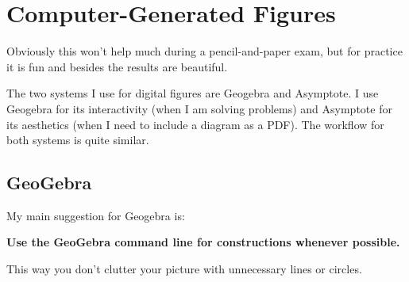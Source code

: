 \documentclass[11pt]{scrartcl}
\begin{document}
\section{Computer-Generated Figures}
Obviously this won't help much during a pencil-and-paper exam,
but for practice it is fun and besides the results are beautiful.

The two systems I use for digital figures are Geogebra and Asymptote.
I use Geogebra for its interactivity (when I am solving problems)
and Asymptote for its aesthetics (when I need to include a diagram as a PDF).
The workflow for both systems is quite similar.

\subsection{GeoGebra}
My main suggestion for Geogebra is:
\begin{mdframed}
  \bfseries\color{red}
  Use the GeoGebra command line for constructions whenever possible.
\end{mdframed}
This way you don't clutter your picture with unnecessary lines or circles.
\end{document}
